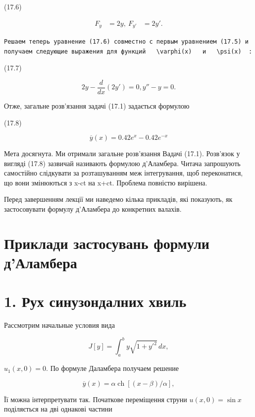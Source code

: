 \documentclass[
  ukrainian,
]{article}
\begin{document}
(17.6)

\[
\begin{aligned} F_y &= 2y, \ F_{y'} &= 2y'. \end{aligned}
\]

\begin{verbatim}
Решаем теперь уравнение (17.6) совместно с первым уравнением (17.5) и получаем следующие выражения для функций   \varphi(x)   и   \psi(x)  :
\end{verbatim}

(17.7)

\[
2y - \frac{d}{dx}(2y') = 0,
y'' - y = 0.
\]

Отже, загальне розв'язання задачі (17.1) задається формулою

(17.8)

\[
\overline{y}(x) = 0.42e^x - 0.42e^{-x}
\]

Мета досягнута. Ми отримали загальне розв'язання Вадачі (17.1).
Розв'язок у вигляді (17.8) зазвичай називають формулою д'Аламбера.
Читача запрошують самостійно слідкувати за розташуванням меж
інтегрування, щоб переконатися, що вони змінюються з x-ct на x+ct.
Проблема повністю вирішена.

Перед завершенням лекції ми наведемо кілька прикладів, які показують, як
застосовувати формулу д'Аламбера до конкретних валахів.

\section{Приклади застосувань формули
д'Аламбера}\label{ux43fux440ux438ux43aux43bux430ux434ux438-ux437ux430ux441ux442ux43eux441ux443ux432ux430ux43dux44c-ux444ux43eux440ux43cux443ux43bux438-ux434ux430ux43bux430ux43cux431ux435ux440ux430}

\section{1. Рух синузондалних
хвиль}\label{ux440ux443ux445-ux441ux438ux43dux443ux437ux43eux43dux434ux430ux43bux43dux438ux445-ux445ux432ux438ux43bux44c}

Рассмотрим начальные условия вида

\[
J[y] = \int_a^b y \sqrt{1 + y'^2} \, dx,
\]

\(u_1(x, 0) = 0.\) По формуле Даламбера получаем решение

\[
\overline{y}(x) = \alpha \operatorname{ch}[(x-\beta)/\alpha],
\]

Її можна інтерпретувати так. Початкове переміщення струни
\(u(x, 0) = \sin x\) поділяється на дві однакові частини
\end{document}
